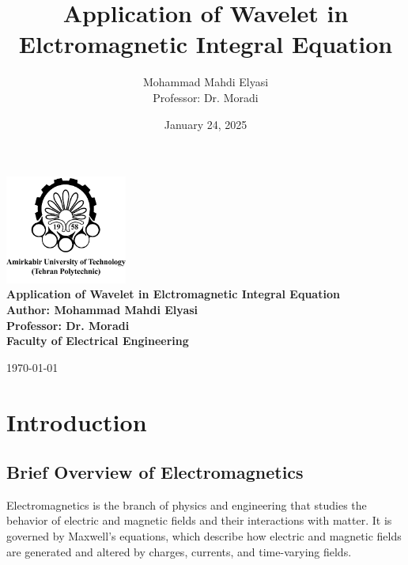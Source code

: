 \documentclass[12pt]{article}
\title{Application of Wavelet in Elctromagnetic Integral Equation}
\author{Mohammad Mahdi Elyasi \\ Professor: Dr. Moradi}
\date{January 24, 2025}
\begin{document}
\begin{center}
    \includegraphics[width=0.3\textwidth]{amirkabir.png} \\[2em]
    \LARGE \textbf{Application of Wavelet in Elctromagnetic Integral Equation} \\[1em]
    \large \textbf{Author: Mohammad Mahdi Elyasi} \\[1em]
    \large \textbf{Professor: Dr. Moradi} \\[4em]
    \large \textbf{Faculty of Electrical Engineering} \\[2em]

\end{center}

\vfill
\begin{center}
    \large \today
\end{center}


\newpage

\tableofcontents
\newpage

\section{Introduction}

\subsection{Brief Overview of Electromagnetics}
Electromagnetics is the branch of physics and engineering that studies the behavior of electric and magnetic fields and their interactions with matter. It is governed by Maxwell’s equations, which describe how electric and magnetic fields are generated and altered by charges, currents, and time-varying fields.
\end{document}
